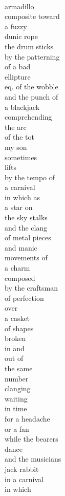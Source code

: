 \documentclass[smalldemyvopaper,11pt,twoside,onecolumn,openright,extrafontsizes]{memoir}
\begin{document}
\\armadillo
\\composite toward
\\a fuzzy
\\dunic rope
\\the drum sticks
\\by the patterning
\\of a bad
\\ellipture
\\eq. of the wobble
\\and the punch of
\\a blackjack
\\comprehending
\\the arc
\\of the tot
\\my son
\\sometimes
\\lifts
\\by the tempo of
\\a carnival
\\in which as
\\a star on
\\the sky stalks
\\and the clang
\\of metal pieces
\\and manic
\\movements of
\\a charm
\\composed
\\by the craftsman
\\of perfection
\\over
\\a casket
\\of shapes
\\broken
\\in and
\\out of
\\the same
\\number
\\clanging
\\waiting
\\in time
\\for a headache
\\or a fan
\\while the bearers
\\dance
\\and the musicians
\\jack rabbit
\\in a carnival
\\in which
\end{document}
